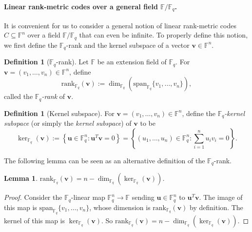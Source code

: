 \documentclass[11pt]{article}
\theoremstyle{plain}
\newtheorem{lemma}[thm]{Lemma}
\theoremstyle{definition}
\newtheorem{defn}[thm]{Definition}
\theoremstyle{remark}
\newcommand{\F}{\mathbb{F}}
\newcommand{\spa}{\mathrm{span}}
\newcommand{\bv}{\bm{v}}
\newcommand{\bu}{\bm{u}}
\newcommand{\rank}{\mathrm{rank}}
\begin{document}
\paragraph{Linear rank-metric codes over a general field $\F/\F_q$.}

It is convenient for us to consider a general notion of linear rank-metric codes $C\subseteq \F^n$ over a field $\F/\F_q$ that can even be infinite. To properly define this notion, we first define the $\F_q$-rank and the kernel subspace of a vector $\bv\in \F^n$.

\begin{defn}[$\F_q$-rank]
Let $\F$ be an extension field of $\F_q$.
For $\bv=(v_1,\dots,v_n)\in \F^n$, define 
\[
\rank_{\F_q}(\bv):=\dim_{\F_q}(\spa_{\F_q}\{v_1,\ldots,v_n\}),
\]
called the \emph{$\F_q$-rank} of $\bv$.
\end{defn}

\begin{defn}[Kernel subspace]
For $\bv=(v_1,\dots,v_n)\in \F^n$, define the \emph{$\F_q$-kernel subspace} (or simply the \emph{kernel subspace}) of $\bv$ to be
\[
\ker_{\F_q}(\bv):=\left\{\bu\in \F_q^n: \bu^T \bv=0\right\}=\left\{(u_1,\dots,u_n)\in \F_q^n: \sum_{i=1}^n u_i v_i=0\right\}.
\]
\end{defn}

The following lemma can be seen as an alternative definition of the $\F_q$-rank.

\begin{lemma} \label{lem:rank-kernel}
$\rank_{\F_q}(\bv)=n-\dim_{\F_q}(\ker_{\F_q}(\bv))$.
\end{lemma}

\begin{proof}
Consider the $\F_q$-linear map $\F_q^n\to \F$ sending $\bu\in\F_q^n$ to $\bu^T \bv$. The image of this map is $\spa_{\F_q}\{v_1,\ldots,v_n\}$, whose dimension is $\rank_{\F_q}(\bv)$ by definition. The kernel of this map is $\ker_{\F_q}(\bv)$. So $\rank_{\F_q}(\bv)=n-\dim_{\F_q}(\ker_{\F_q}(\bv))$. 
\end{proof}
\end{document}
